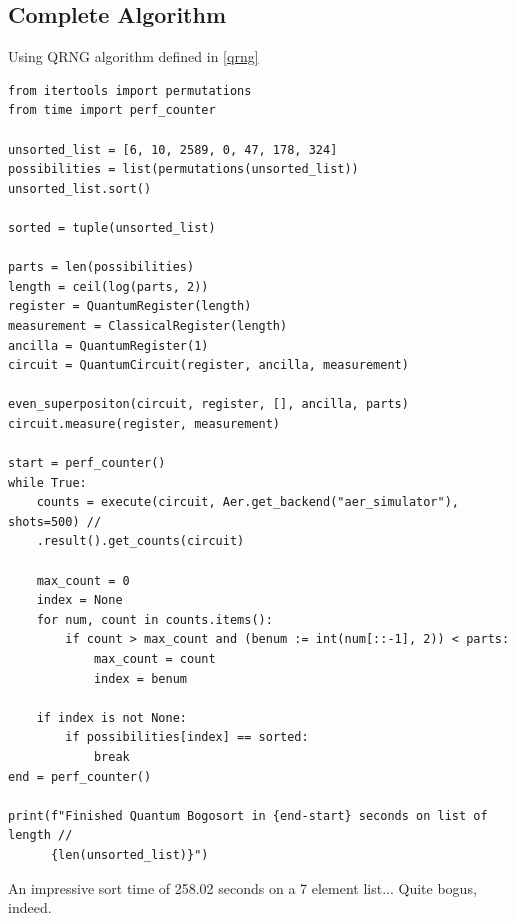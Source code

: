 \documentclass[12pt]{article}
\begin{document}
\subsection{Complete Algorithm}
Using QRNG algorithm defined in \ref{qrng}
\begin{verbatim}
from itertools import permutations
from time import perf_counter

unsorted_list = [6, 10, 2589, 0, 47, 178, 324]
possibilities = list(permutations(unsorted_list))
unsorted_list.sort()

sorted = tuple(unsorted_list)

parts = len(possibilities)
length = ceil(log(parts, 2))
register = QuantumRegister(length)
measurement = ClassicalRegister(length)
ancilla = QuantumRegister(1)
circuit = QuantumCircuit(register, ancilla, measurement)

even_superpositon(circuit, register, [], ancilla, parts)
circuit.measure(register, measurement)

start = perf_counter()
while True:
    counts = execute(circuit, Aer.get_backend("aer_simulator"), shots=500) //
    .result().get_counts(circuit)

    max_count = 0
    index = None
    for num, count in counts.items():
        if count > max_count and (benum := int(num[::-1], 2)) < parts:
            max_count = count
            index = benum

    if index is not None:
        if possibilities[index] == sorted:
            break
end = perf_counter()

print(f"Finished Quantum Bogosort in {end-start} seconds on list of length //
      {len(unsorted_list)}")
\end{verbatim}
An impressive sort time of 258.02 seconds on a 7 element list... Quite bogus, indeed.
\end{document}
